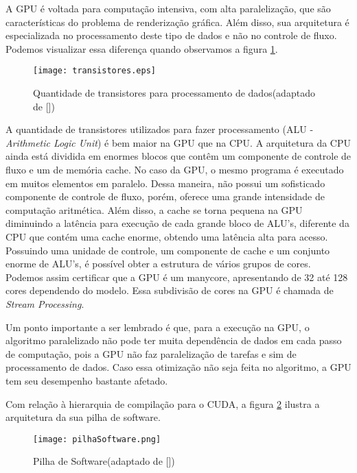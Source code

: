 A GPU é voltada para computação intensiva, com alta paralelização, que são características do problema de renderização gráfica. Além disso, sua arquitetura é especializada no processamento deste tipo de dados e não no controle de fluxo. Podemos visualizar essa diferença quando observamos a figura \ref{fig:transistores}.

\begin{figure}[!htb]
	\begin{center}
	\centering
			\texttt{[image: transistores.eps]}
	\caption{Quantidade de transistores para processamento de dados(adaptado de [\cite{cuda}])}
	\label{fig:transistores}
	\end{center}
\end{figure}

A quantidade de transistores utilizados para fazer processamento (ALU - \textit{Arithmetic Logic Unit}) é bem maior na GPU que na CPU. A arquitetura da CPU ainda está dividida em enormes blocos que contêm um componente de controle de fluxo e um de memória cache. No caso da GPU, o mesmo programa é executado em muitos elementos em paralelo. Dessa maneira, não possui um sofisticado componente de controle de fluxo, porém, oferece uma grande intensidade de computação aritmética. Além disso, a cache se torna pequena na GPU diminuindo a latência para execução de cada grande bloco de ALU's, diferente da CPU que contém uma cache enorme, obtendo uma latência alta para acesso. Possuindo uma unidade de controle, um componente de cache e um conjunto enorme de ALU's, é possível obter a estrutura de vários grupos de
cores. Podemos assim certificar que a GPU é um manycore, apresentando de 32 até 128 cores dependendo do modelo. Essa subdivisão de cores na GPU é chamada de \textit{Stream Processing}.

Um ponto importante a ser lembrado é que, para a execução na GPU, o algoritmo paralelizado não pode ter muita dependência de dados em cada passo de computação, pois a GPU não faz paralelização de tarefas e sim de processamento de dados. Caso essa otimização não seja feita no algoritmo, a GPU tem seu desempenho bastante afetado.

Com relação à hierarquia de compilação para o CUDA, a figura \ref{fig:pilhasoftware} ilustra a arquitetura da sua pilha de software.

\begin{figure}[!htb]
	\begin{center}
	\centering
			\texttt{[image: pilhaSoftware.png]}
	\caption{Pilha de Software(adaptado de [\cite{cuda}])}
	\label{fig:pilhasoftware}
	\end{center}
\end{figure}

